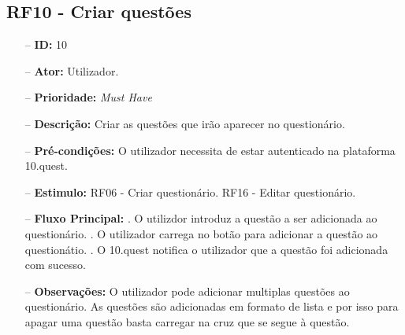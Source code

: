 \subsection{RF10 - Criar questões}
\begin{itemize}
	\item[--] \textbf{ID:} 10
	\item[--]  \textbf{Ator:} Utilizador.
	\item[--]  \textbf{Prioridade:} \textit{Must Have}
	\item[--]  \textbf{Descrição:} Criar as questões que irão aparecer no questionário.
	\item[--]  \textbf{Pré-condições:} O utilizador necessita de estar autenticado na plataforma 10.quest.
	\item[--]  \textbf{Estimulo:}  
		\subitem RF06 - Criar questionário.
		\subitem RF16 - Editar questionário.
	\item[--]  \textbf{Fluxo Principal:} 
		. O utilizdor introduz a questão a ser adicionada ao questionário.
		. O utilizador carrega no botão para adicionar a questão ao questionátio.
		. O 10.quest notifica o utilizador que a questão foi adicionada com sucesso.
	\item[--]  \textbf{Observações:} O utilizador pode adicionar multiplas questões ao questionário. As questões são adicionadas em formato de lista e por isso para apagar uma questão basta carregar na cruz que se segue à questão.
\end{itemize}
\newpage

